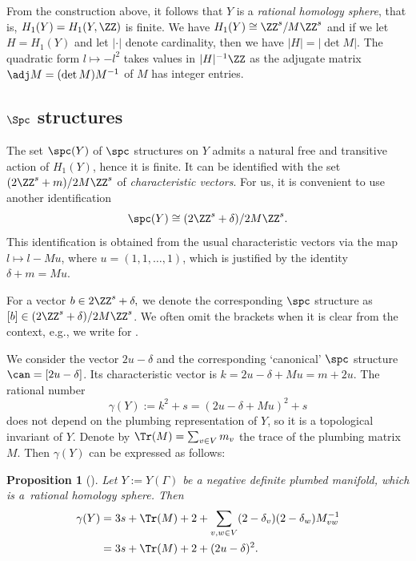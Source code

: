 \documentclass[pdftex]{sigma}
\newtheorem{Proposition}[Theorem]{Proposition}
 { \theoremstyle{definition}
\newtheorem{Definition}[Theorem]{Definition}
\newtheorem{Note}[Theorem]{Note}
\newtheorem{Example}[Theorem]{Example}
\newtheorem{Remark}[Theorem]{Remark}
\newtheorem{Question}[theorem]{Question}
}
\begin{document}
From the construction above, it follows that $Y$ is a \emph{rational homology sphere}, that is, $H_1(Y) = H_1(Y,\ZZ)$ is finite. We have $H_1(Y) \cong \ZZ^s/M \ZZ^s$ and if we let $H = H_1(Y)$ and let $\lvert\cdot\rvert$ denote cardinality, then we have $\lvert H\rvert=\lvert\det M\rvert$. The quadratic form $l \mapsto -l^2$ takes values in $\lvert H\rvert^{-1}\ZZ$ as the adjugate matrix $\adj M = (\det M) M^{-1}$ of $M$ has integer entries.

\subsection[Spin\^{}c structures]{$\boldsymbol{\Spc}$ structures}\label{ss:spinc}

The set $\spc(Y)$ of $\spc$ structures on $Y$ admits a natural free and transitive action of $H_1(Y)$, hence it is finite. It can be identified with the set $(2\ZZ^s + m)/2M\ZZ^s$ of \emph{characteristic vectors}. For us, it is convenient to use another identification
\begin{equation}\label{eq:spinc_identif}
\spc(Y) \cong (2\ZZ^s + \delta)/2M\ZZ^s.
\end{equation}
This identification is obtained from the usual characteristic vectors via the map $l \mapsto l - Mu$, where $u = (1, 1, \dots, 1)$, which is justified by the identity $ \delta + m = Mu$.

For a vector $b \in 2\ZZ^s + \delta,$ we denote the corresponding $\spc$ structure as $[b] \in (2\ZZ^s + \delta)/2M\ZZ^s$. We often omit the brackets when it is clear from the context, e.g., we write  for \smash{$\Zhat_{[b]}$}.

We consider the vector $2u - \delta$ and the corresponding `canonical' $\spc$ structure $\can = [2u-\delta]$. Its characteristic vector is $k = 2u-\delta + Mu = m + 2u$. The rational number
\[
\gamma(Y) := k^2+s = (2u-\delta +Mu)^2+s
\]
does not depend on the plumbing representation of $Y$, so it is a topological invariant of $Y$.
Denote by $\Tr(M) = \sum_{v \in V}m_v$ the trace of the plumbing matrix $M$. Then $\gamma(Y)$ can be expressed as follows:
\begin{Proposition}[\cite{NeNi02}]\label{base-k2-s}
 Let $Y:=Y(\Gamma)$ be a negative definite plumbed manifold, which is a~rational homology sphere. Then
 \begin{align*}
 \gamma(Y) &{}= 3s + \Tr(M) + 2 + \sum_{v,w \in V} (2-\delta_v)(2-\delta_w)M_{vw}^{-1}\\
 &{}=3s + \Tr(M) + 2 + (2u-\delta)^2.
 \end{align*}
\end{Proposition}
\end{document}
